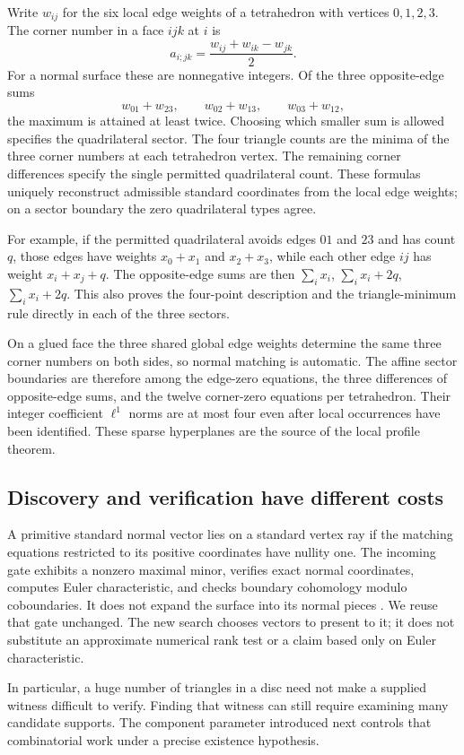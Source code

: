 Write $w_{ij}$ for the six local edge weights of a tetrahedron with vertices
$0,1,2,3$. The corner number in a face $ijk$ at $i$ is
\[
 a_{i;jk}=\frac{w_{ij}+w_{ik}-w_{jk}}2.
\]
For a normal surface these are nonnegative integers. Of the three opposite-edge
sums
\[
 w_{01}+w_{23},\qquad w_{02}+w_{13},\qquad w_{03}+w_{12},
\]
the maximum is attained at least twice. Choosing which smaller sum is allowed
specifies the quadrilateral sector. The four triangle counts are the minima
of the three corner numbers at each tetrahedron vertex. The remaining corner
differences specify the single permitted quadrilateral count. These formulas
uniquely reconstruct admissible standard coordinates from the local edge
weights; on a sector boundary the zero quadrilateral types agree.

For example, if the permitted quadrilateral avoids edges $01$ and $23$ and
has count $q$, those edges have weights $x_0+x_1$ and $x_2+x_3$, while
each other edge $ij$ has weight $x_i+x_j+q$. The opposite-edge sums are
then $\sum_i x_i$, $\sum_i x_i+2q$, $\sum_i x_i+2q$.
This also proves the four-point description and the triangle-minimum rule
directly in each of the three sectors.

On a glued face the three shared global edge weights determine the same
three corner numbers on both sides, so normal matching is automatic.
The affine sector boundaries are therefore among the edge-zero equations,
the three differences of opposite-edge sums, and the twelve corner-zero
equations per tetrahedron. Their integer coefficient $\ell^1$ norms are at
most four even after local occurrences have been identified. These sparse
hyperplanes are the source of the local profile theorem.

\subsection{Discovery and verification have different costs}

A primitive standard normal vector lies on a standard vertex ray if the
matching equations restricted to its positive coordinates have nullity one.
The incoming gate exhibits a nonzero maximal minor, verifies exact normal
coordinates, computes Euler characteristic, and checks boundary cohomology
modulo coboundaries. It does not expand the surface into its normal pieces
\cite{incoming-cancellation}. We reuse that gate unchanged. The new search
chooses vectors to present to it; it does not substitute an approximate
numerical rank test or a claim based only on Euler characteristic.

In particular, a huge number of triangles in a disc need not make a supplied
witness difficult to verify. Finding that witness can still require examining
many candidate supports. The component parameter introduced next controls
that combinatorial work under a precise existence hypothesis.
